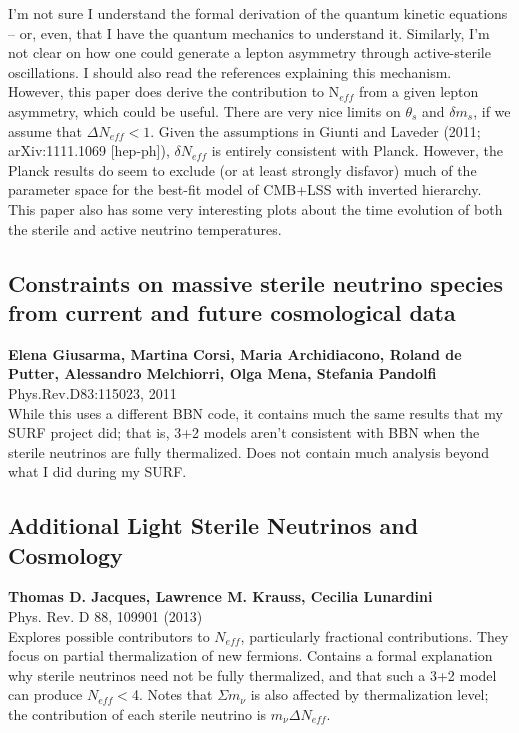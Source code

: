 \documentclass[english]{article}
\begin{document}
\noindent I'm not sure I understand the formal derivation of the quantum kinetic equations -- or, even, that I have the quantum mechanics to understand it.  Similarly, I'm not clear on how one could generate a lepton asymmetry through active-sterile oscillations.  I should also read the references explaining this mechanism.\\

\noindent However, this paper does derive the contribution to N$_{eff}$ from a given lepton asymmetry, which could be useful.  There are very nice limits on $\theta_s$ and $\delta m_s$, if we assume that $\Delta N_{eff} < 1$.  Given the assumptions in Giunti and Laveder (2011; arXiv:1111.1069 [hep-ph]), $\delta N_{eff}$ is entirely consistent with Planck.  However, the Planck results do seem to exclude (or at least strongly disfavor) much of the parameter space for the best-fit model of CMB+LSS with inverted hierarchy. \\

\noindent This paper also has some very interesting plots about the time evolution of both the sterile and active neutrino temperatures.\\

\subsection{Constraints on massive sterile neutrino species from current and future cosmological data}
\noindent \textbf{Elena Giusarma, Martina Corsi, Maria Archidiacono, Roland de Putter, Alessandro Melchiorri, Olga Mena, Stefania Pandolfi} \\
\noindent Phys.Rev.D83:115023, 2011 \\

\noindent While this uses a different BBN code, it contains much the same results that my SURF project did; that is, 3+2 models aren't consistent with BBN when the sterile neutrinos are fully thermalized.  Does not contain much analysis beyond what I did during my SURF. 

\subsection{Additional Light Sterile Neutrinos and Cosmology}
\noindent \textbf{Thomas D. Jacques, Lawrence M. Krauss, Cecilia Lunardini} \\
\noindent Phys. Rev. D 88, 109901 (2013) \\

\noindent Explores possible contributors to $N_{eff}$, particularly fractional contributions.  They focus on partial thermalization of new fermions.  Contains a formal explanation why sterile neutrinos need not be fully thermalized, and that such a 3+2 model can produce $N_{eff} < $4.  Notes that $\Sigma m_\nu$ is also affected by thermalization level; the contribution of each sterile neutrino is $m_\nu\Delta N_{eff}$. \\
\end{document}
